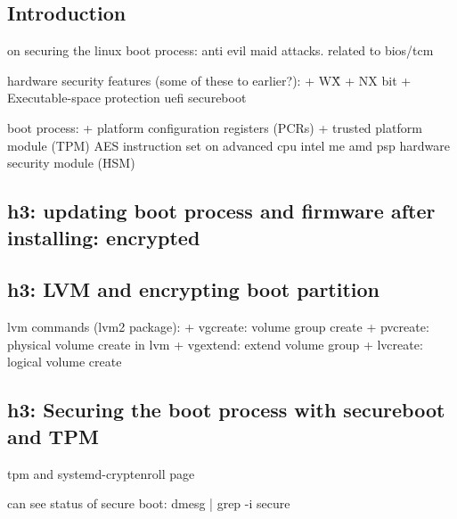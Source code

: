 
\subsection{Introduction}


on securing the linux boot process: anti evil maid attacks. related to bios/tcm

hardware security features (some of these to earlier?):
+ W\^X
+ NX bit
+ Executable-space protection
uefi secureboot

boot process:
+ platform configuration registers (PCRs)
+ trusted platform module (TPM)
AES instruction set on advanced cpu
intel me
amd psp
hardware security module (HSM)

\subsection{h3: updating boot process and firmware after installing: encrypted}
\subsection{h3: LVM and encrypting boot partition}

lvm commands (lvm2 package):
+ vgcreate: volume group create
+ pvcreate: physical volume create in lvm
+ vgextend: extend volume group
+ lvcreate: logical volume create
\subsection{h3: Securing the boot process with secureboot and TPM}
tpm and systemd-cryptenroll page

can see status of secure boot: dmesg | grep -i secure

